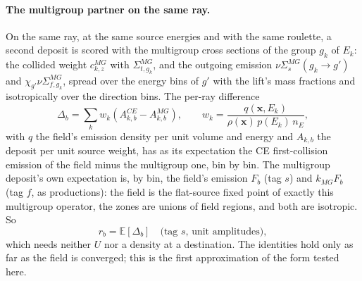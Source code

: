 \paragraph{The multigroup partner on the same ray.} On the same ray, at the same source energies and
with the same roulette, a second deposit is scored with the multigroup cross sections of the group
$g_k$ of $E_k$: the collided weight $c^{MG}_{k,z}$ with $\Sigma^{MG}_{t,g_k}$, and the outgoing
emission $\nu\Sigma^{MG}_{s}(g_k\to g')$ and $\chi_{g'}\nu\Sigma^{MG}_{f,g_k}$, spread over the
energy bins of $g'$ with the lift's mass fractions and isotropically over the direction bins. The
per-ray difference
\begin{equation}
\Delta_b=\sum_k w_k\left(A^{CE}_{k,b}-A^{MG}_{k,b}\right),\qquad w_k=\frac{q(\mathbf x,E_k)}{\rho(\mathbf x)\,p(E_k)\,n_E},
\end{equation}
with $q$ the field's emission density per unit volume and energy and $A_{k,b}$ the deposit per unit
source weight, has as its expectation the CE first-collision emission of the field minus the
multigroup one, bin by bin. The multigroup deposit's own expectation is, by bin, the field's emission $F_b$ (tag $s$) and
$k_{MG}F_b$ (tag $f$, as productions): the field is the flat-source fixed point of exactly this
multigroup operator, the zones are unions of field regions, and both are isotropic. So
\begin{equation}
r_b=\mathbb E[\Delta_b]\quad\text{(tag $s$, unit amplitudes)},
\end{equation}
which needs neither $U$ nor a density at a destination. The identities hold only as far as the
field is converged; this is the first approximation of the form tested here.

